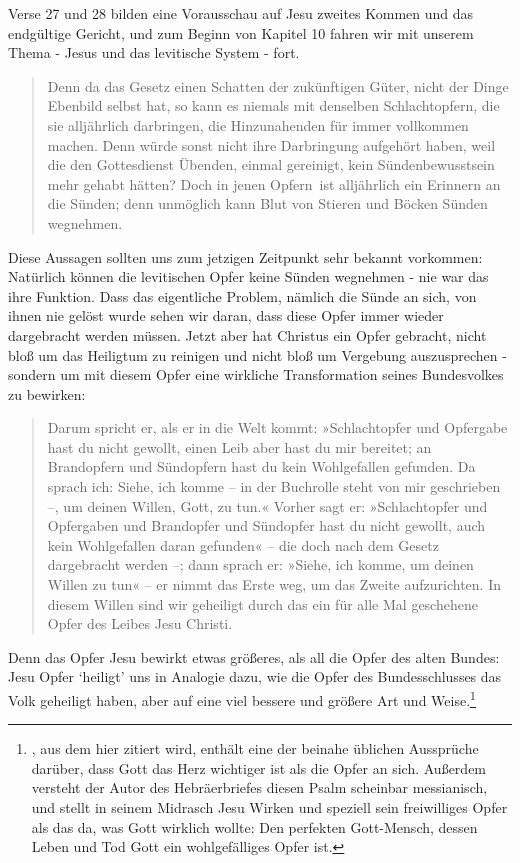 Verse 27 und 28 bilden eine Vorausschau auf Jesu zweites Kommen und das endgültige Gericht, und zum Beginn von Kapitel 10 fahren wir mit unserem Thema - Jesus und das levitische System - fort.
\begin{quote}
Denn da das Gesetz einen Schatten der zukünftigen Güter, nicht der Dinge Ebenbild selbst hat, so kann es niemals mit denselben Schlachtopfern,
die sie alljährlich darbringen, die Hinzunahenden für immer vollkommen machen.
Denn würde sonst nicht ihre Darbringung aufgehört haben, weil die den Gottesdienst Übenden, einmal gereinigt, kein Sündenbewusstsein mehr gehabt hätten?
Doch in jenen \textlangle Opfern\textrangle\ ist alljährlich ein Erinnern an die Sünden;
denn unmöglich kann Blut von Stieren und Böcken Sünden wegnehmen.
\end{quote}
Diese Aussagen sollten uns zum jetzigen Zeitpunkt sehr bekannt vorkommen: Natürlich können die levitischen Opfer keine Sünden wegnehmen - nie war das ihre Funktion.
Dass das eigentliche Problem, nämlich die Sünde an sich, von ihnen nie gelöst wurde sehen wir daran, dass diese Opfer immer wieder dargebracht werden müssen.
Jetzt aber hat Christus ein Opfer gebracht, nicht bloß um das Heiligtum zu reinigen und nicht bloß um Vergebung auszusprechen - sondern um mit diesem Opfer eine wirkliche Transformation seines Bundesvolkes zu bewirken:
\begin{quote}
Darum spricht er, als er in die Welt kommt: »Schlachtopfer und Opfergabe hast du nicht gewollt, einen Leib aber hast du mir bereitet;
an Brandopfern und Sündopfern hast du kein Wohlgefallen gefunden.
Da sprach ich: Siehe, ich komme – in der Buchrolle steht von mir geschrieben –, um deinen Willen, Gott, zu tun.«
Vorher sagt er: »Schlachtopfer und Opfergaben und Brandopfer und Sündopfer hast du nicht gewollt, auch kein Wohlgefallen daran gefunden« –
die doch nach dem Gesetz dargebracht werden –;
dann sprach er: »Siehe, ich komme, um deinen Willen zu tun« – er nimmt das Erste weg, um das Zweite aufzurichten.
In diesem Willen sind wir geheiligt durch das ein für alle Mal geschehene Opfer des Leibes Jesu Christi.
\end{quote}
Denn das Opfer Jesu bewirkt etwas größeres, als all die Opfer des alten Bundes:
Jesu Opfer `heiligt' uns in Analogie dazu, wie die Opfer des Bundesschlusses das Volk geheiligt haben, aber auf eine viel bessere und größere Art und Weise.\footnote{
, aus dem hier zitiert wird, enthält eine der beinahe üblichen Aussprüche darüber, dass Gott das Herz wichtiger ist als die Opfer an sich.
Außerdem versteht der Autor des Hebräerbriefes diesen Psalm scheinbar messianisch, und stellt in seinem Midrasch Jesu Wirken und speziell sein freiwilliges Opfer als das da, was Gott wirklich wollte:
Den perfekten Gott-Mensch, dessen Leben und Tod Gott ein wohlgefälliges Opfer ist.}
